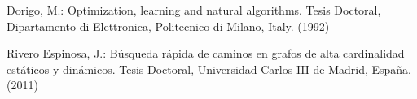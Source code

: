 
\begin{thebibliography}{5}
%
Dorigo, M.:
Optimization, learning and natural algorithms.
Tesis Doctoral, Dipartamento di Elettronica, Politecnico di Milano, Italy. (1992)

Rivero Espinosa, J.:
Búsqueda rápida de caminos en grafos de alta cardinalidad estáticos y dinámicos.
Tesis Doctoral, Universidad Carlos III de Madrid, España. (2011) 

\end{thebibliography}
